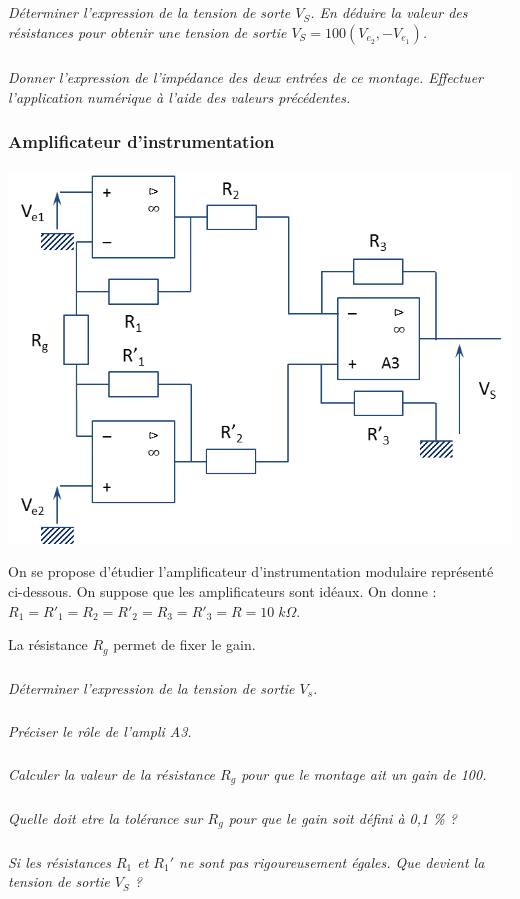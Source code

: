 \documentclass[10pt]{article}
\begin{document}
\subparagraph{}
\textit{Déterminer l'expression de la tension de sorte $V_S$. En déduire la valeur des résistances pour obtenir une tension de sortie $V_S = 100 \left( V_{e_2}, - V_{e_1}\right)$.}

\subparagraph{}
\textit{Donner l'expression de l'impédance des deux entrées de ce montage. Effectuer l'application numérique à l'aide des valeurs précédentes. }

\subsubsection*{Amplificateur d'instrumentation}

\begin{center}
\includegraphics[width=.75\textwidth]{images/AO2}
\end{center}


On se propose d'étudier l'amplificateur d'instrumentation modulaire représenté ci-dessous. On suppose que les amplificateurs sont idéaux. On donne : $R_1 = R'_1 = R_2 = R'_2 = R_3 = R'_3=R = 10\; k\Omega$. 

La résistance $R_g$ permet de fixer le gain. 
\subparagraph{}
\textit{Déterminer l'expression de la tension de sortie $V_s$. }
\subparagraph{}
\textit{Préciser le rôle de l'ampli A3.}
\subparagraph{}
\textit{Calculer la valeur de la résistance $R_g$ pour que le montage ait un gain de 100.}
\subparagraph{}
\textit{Quelle doit etre la tolérance sur $R_g$ pour que le gain soit défini à 0,1 \% ? }
\subparagraph{}
\textit{Si les résistances $R_1$ et $R_1'$ ne sont pas rigoureusement égales. Que devient la tension de sortie $V_S$ ?}
\subparagraph{}
\textit{}
\end{document}
